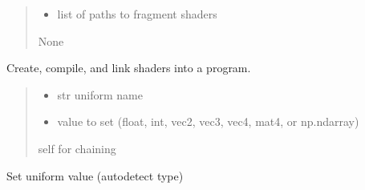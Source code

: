 \documentclass[a4paper,10pt,english,openany,oneside]{sphinxmanual}
\begin{document}
\begin{fulllineitems}
\begin{fulllineitems}
\begin{quote}
\begin{description}
\begin{itemize}
\item {} 
\sphinxAtStartPar
{} \textendash{} list of paths to fragment shaders

\end{itemize}

\sphinxAtStartPar
None

\end{description}\end{quote}

\sphinxAtStartPar
Create, compile, and link shaders into a program.

\end{fulllineitems}


\begin{fulllineitems}
\label{\detokenize{api/shaders:picogl.backend.modern.core.shader.program.ShaderProgram.uniform}}
\pysigstartsignatures
\pysiglinewithargsret
{}
{\sphinxparamcomma {}}
{}
\pysigstopsignatures\begin{quote}\begin{description}
\begin{itemize}
\item {} 
\sphinxAtStartPar
{} \textendash{} str \sphinxhyphen{} uniform name

\item {} 
\sphinxAtStartPar
{} \textendash{} value to set (float, int, vec2, vec3, vec4, mat4, or np.ndarray)

\end{itemize}

\sphinxAtStartPar
self \sphinxhyphen{} for chaining

\end{description}\end{quote}

\sphinxAtStartPar
Set uniform value (auto\sphinxhyphen{}detect type)

\end{fulllineitems}


\end{fulllineitems}
\end{document}
